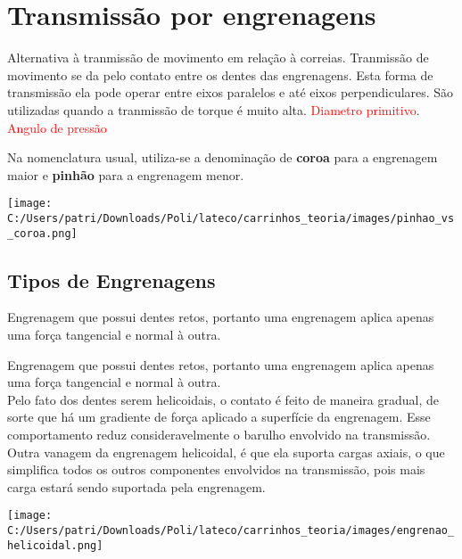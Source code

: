 \section{Transmissão por engrenagens}

Alternativa à tranmissão de movimento em relação à correias. Tranmissão de movimento se da pelo contato entre os dentes das engrenagens. Esta forma de transmissão ela pode operar entre eixos paralelos e até eixos perpendiculares. São utilizadas quando a tranmissão de torque é muito alta. \textcolor{red}{Diametro primitivo}. \textcolor{red}{Angulo de pressão}
	
Na nomenclatura usual, utiliza-se a denominação de \textbf{coroa} para a engrenagem maior e \textbf{pinhão} para a engrenagem menor.

	\begin{center}
	\texttt{[image: C:/Users/patri/Downloads/Poli/lateco/carrinhos\_teoria/images/pinhao\_vs\_coroa.png]}
	\end{center}
	
\subsection{Tipos de Engrenagens}

\begin{namedtheorem}
Engrenagem que possui dentes retos, portanto uma engrenagem aplica apenas uma força tangencial e normal à outra.
\end{namedtheorem}

\begin{namedtheorem}
Engrenagem que possui dentes retos, portanto uma engrenagem aplica apenas uma força tangencial e normal à outra.\\
Pelo fato dos dentes serem helicoidais, o contato é feito de maneira gradual, de sorte que há um gradiente de força aplicado a superfície da engrenagem. Esse comportamento reduz consideravelmente o barulho envolvido na transmissão. Outra vanagem da engrenagem helicoidal, é que ela suporta cargas axiais, o que simplifica todos os outros componentes envolvidos na transmissão, pois mais carga estará sendo suportada pela engrenagem.

	\begin{center}
	\texttt{[image: C:/Users/patri/Downloads/Poli/lateco/carrinhos\_teoria/images/engrenao\_helicoidal.png]}
	\end{center}

\end{namedtheorem}

